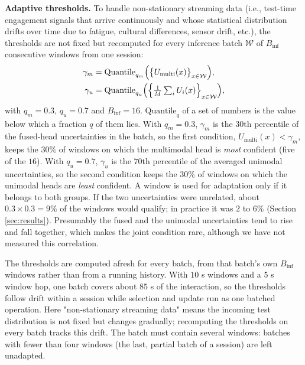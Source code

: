 \documentclass[10pt,a4paper,twocolumn]{article}
\begin{document}
	\textbf{Adaptive thresholds.} To handle non-stationary streaming data (i.e., test-time engagement signals that arrive continuously and whose statistical distribution drifts over time due to fatigue, cultural differences, sensor drift, etc.), the thresholds are not fixed but recomputed for every inference batch $\mathcal{W}$ of $B_{\text{inf}}$ consecutive windows from one session:
	$$\begin{aligned}
	\gamma_m &= \mathrm{Quantile}_{q_m}\Bigl(\bigl\{U_{\text{multi}}(x)\bigr\}_{x \in \mathcal{W}}\Bigr), \\
	\gamma_u &= \mathrm{Quantile}_{q_u}\Bigl(\Bigl\{\tfrac{1}{M}\textstyle\sum_{i} U_i(x)\Bigr\}_{x \in \mathcal{W}}\Bigr),
	\end{aligned}$$
	with $q_m = 0.3$, $q_u = 0.7$ and $B_{\text{inf}} = 16$. $\mathrm{Quantile}_q$ of a set of numbers is the value below which a fraction $q$ of them lies. With $q_m = 0.3$, $\gamma_m$ is the $30$th percentile of the fused-head uncertainties in the batch, so the first condition, $U_{\text{multi}}(x) < \gamma_m$, keeps the $30\%$ of windows on which the multimodal head is \emph{most} confident (five of the $16$). With $q_u = 0.7$, $\gamma_u$ is the $70$th percentile of the averaged unimodal uncertainties, so the second condition keeps the $30\%$ of windows on which the unimodal heads are \emph{least} confident. A window is used for adaptation only if it belongs to both groups. If the two uncertainties were unrelated, about $0.3 \times 0.3 = 9\%$ of the windows would qualify; in practice it was $2$ to $6\%$ (Section \ref{sec:results}). Presumably the fused and the unimodal uncertainties tend to rise and fall together, which makes the joint condition rare, although we have not measured this correlation.

	The thresholds are computed afresh for every batch, from that batch's own $B_{\text{inf}}$ windows rather than from a running history. With $10$ s windows and a $5$ s window hop, one batch covers about $85$ s of the interaction, so the thresholds follow drift within a session while selection and update run as one batched operation. Here "non-stationary streaming data" means the incoming test distribution is not fixed but changes gradually; recomputing the thresholds on every batch tracks this drift. The batch must contain several windows: batches with fewer than four windows (the last, partial batch of a session) are left unadapted.
\end{document}
